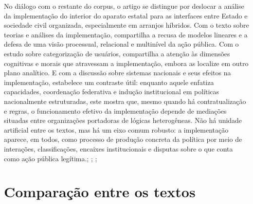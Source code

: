 \documentclass[12pt,a4paper]{article}
\begin{document}
No diálogo com o restante do corpus, o artigo se distingue por deslocar a análise da implementação do interior do aparato estatal para as interfaces entre Estado e sociedade civil organizada, especialmente em arranjos híbridos. Com o texto sobre teorias e análises da implementação, compartilha a recusa de modelos lineares e a defesa de uma visão processual, relacional e multinível da ação pública. Com o estudo sobre categorização de usuários, compartilha a atenção às dimensões cognitivas e morais que atravessam a implementação, embora as localize em outro plano analítico. E com a discussão sobre sistemas nacionais e seus efeitos na implementação, estabelece um contraste útil: enquanto aquele enfatiza capacidades, coordenação federativa e indução institucional em políticas nacionalmente estruturadas, este mostra que, mesmo quando há contratualização e regras, o funcionamento efetivo da implementação depende de mediações situadas entre organizações portadoras de lógicas heterogêneas. Não há unidade artificial entre os textos, mas há um eixo comum robusto: a implementação aparece, em todos, como processo de produção concreta da política por meio de interações, classificações, encaixes institucionais e disputas sobre o que conta como ação pública legítima.\parencite{lotta2019_teorias_analises}; \parencite{lotta2020_categorizando_usuarios}; \parencite{bichir2020_sistemas_nacionais}; \parencite{lotta2023_jesus_speaks}



\section{Comparação entre os textos}
\label{sec:orgbf3619f}
\end{document}
